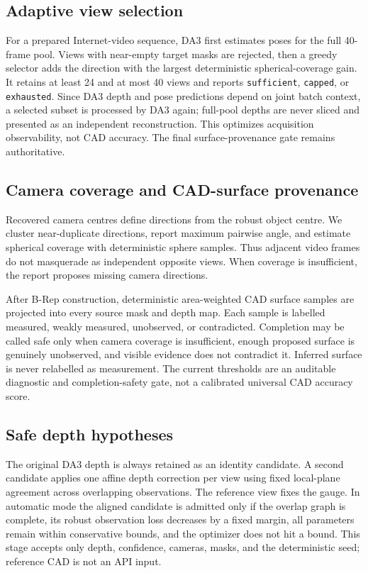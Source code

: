 \documentclass[10pt]{article}
\begin{document}
\subsection{Adaptive view selection}

For a prepared Internet-video sequence, DA3 first estimates poses for the full
40-frame pool.  Views with near-empty target masks are rejected, then a greedy
selector adds the direction with the largest deterministic spherical-coverage
gain.  It retains at least 24 and at most 40 views and reports
\texttt{sufficient}, \texttt{capped}, or \texttt{exhausted}.  Since DA3 depth
and pose predictions depend on joint batch context, a selected subset is
processed by DA3 again; full-pool depths are never sliced and presented as an
independent reconstruction.  This optimizes acquisition observability, not CAD
accuracy.  The final surface-provenance gate remains authoritative.


\subsection{Camera coverage and CAD-surface provenance}

Recovered camera centres define directions from the robust object centre.  We
cluster near-duplicate directions, report maximum pairwise angle, and estimate
spherical coverage with deterministic sphere samples.  Thus adjacent video
frames do not masquerade as independent opposite views.  When coverage is
insufficient, the report proposes missing camera directions.

After B-Rep construction, deterministic area-weighted CAD surface samples are
projected into every source mask and depth map.  Each sample is labelled
measured, weakly measured, unobserved, or contradicted.  Completion may be
called safe only when camera coverage is insufficient, enough proposed surface
is genuinely unobserved, and visible evidence does not contradict it.  Inferred
surface is never relabelled as measurement.  The current thresholds are an
auditable diagnostic and completion-safety gate, not a calibrated universal CAD
accuracy score.

\subsection{Safe depth hypotheses}

The original DA3 depth is always retained as an identity candidate.  A second
candidate applies one affine depth correction per view using fixed local-plane
agreement across overlapping observations.  The reference view fixes the
gauge.  In automatic mode the aligned candidate is admitted only if the
overlap graph is complete, its robust observation loss decreases by a fixed
margin, all parameters remain within conservative bounds, and the optimizer
does not hit a bound.  This stage accepts only depth, confidence, cameras,
masks, and the deterministic seed; reference CAD is not an API input.
\end{document}
